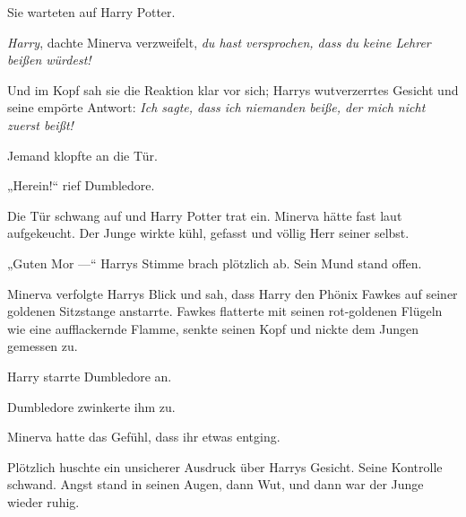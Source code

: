 Sie warteten auf Harry Potter.

\emph{Harry}, dachte Minerva verzweifelt, \emph{du hast versprochen, dass du keine Lehrer beißen würdest!}

Und im Kopf sah sie die Reaktion klar vor sich; Harrys wutverzerrtes Gesicht und seine empörte Antwort: \emph{Ich sagte, dass ich niemanden beiße, der mich nicht zuerst beißt!}

Jemand klopfte an die Tür.

„Herein!“ rief Dumbledore.

Die Tür schwang auf und Harry Potter trat ein. Minerva hätte fast laut aufgekeucht. Der Junge wirkte kühl, gefasst und völlig Herr seiner selbst.

„Guten Mor —“ Harrys Stimme brach plötzlich ab. Sein Mund stand offen.

Minerva verfolgte Harrys Blick und sah, dass Harry den Phönix Fawkes auf seiner goldenen Sitzstange anstarrte. Fawkes flatterte mit seinen rot-goldenen Flügeln wie eine aufflackernde Flamme, senkte seinen Kopf und nickte dem Jungen gemessen zu.

Harry starrte Dumbledore an.

Dumbledore zwinkerte ihm zu.

Minerva hatte das Gefühl, dass ihr etwas entging.

Plötzlich huschte ein unsicherer Ausdruck über Harrys Gesicht. Seine Kontrolle schwand. Angst stand in seinen Augen, dann Wut, und dann war der Junge wieder ruhig.

